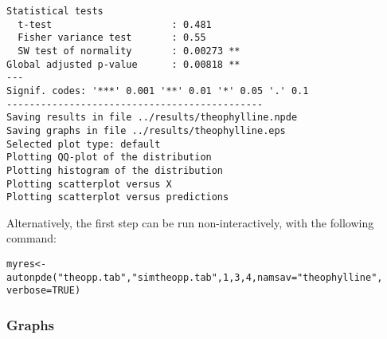 {\begin{verbatim}
Statistical tests
  t-test                     : 0.481
  Fisher variance test       : 0.55
  SW test of normality       : 0.00273 **
Global adjusted p-value      : 0.00818 **
---
Signif. codes: '***' 0.001 '**' 0.01 '*' 0.05 '.' 0.1 
---------------------------------------------
Saving results in file ../results/theophylline.npde 
Saving graphs in file ../results/theophylline.eps 
Selected plot type: default 
Plotting QQ-plot of the distribution
Plotting histogram of the distribution
Plotting scatterplot versus X
Plotting scatterplot versus predictions
\end{verbatim}
}

% 


\bigskip
Alternatively, the first step can be run non-interactively, with the following command:
\begin{verbatim}
myres<-autonpde("theopp.tab","simtheopp.tab",1,3,4,namsav="theophylline",
verbose=TRUE)
\end{verbatim}


\subsubsection{Graphs}

